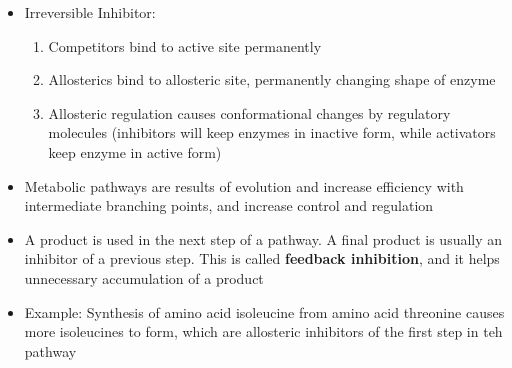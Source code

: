 \documentclass[12pt]{article}
\begin{document}
\begin{itemize}
  \item Irreversible Inhibitor:

    \begin{enumerate}

      \item Competitors bind to active site permanently

      \item Allosterics bind to allosteric site, permanently changing shape of enzyme

      \item Allosteric regulation causes conformational changes by regulatory molecules (inhibitors will keep enzymes in inactive form, while activators keep enzyme in active form)

    \end{enumerate}

  \item Metabolic pathways are results of evolution and increase efficiency with intermediate branching points, and increase control and regulation

  \item A product is used in the next step of a pathway. A final product is usually an inhibitor of a previous step. This is called \textbf{feedback inhibition}, and it helps unnecessary accumulation of a product

  \item Example: Synthesis of amino acid isoleucine from amino acid threonine causes more isoleucines to form, which are allosteric inhibitors of the first step in teh pathway

\end{itemize}
\end{document}
